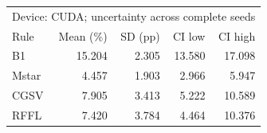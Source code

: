 \begin{tabular}{lrrrr}
\toprule
\multicolumn{5}{l}{Device: CUDA; uncertainty across complete seeds} \\
Rule & Mean (\%) & SD (pp) & CI low & CI high \\
\midrule
B1 & 15.204 & 2.305 & 13.580 & 17.098 \\
Mstar & 4.457 & 1.903 & 2.966 & 5.947 \\
CGSV & 7.905 & 3.413 & 5.222 & 10.589 \\
RFFL & 7.420 & 3.784 & 4.464 & 10.376 \\
\bottomrule
\end{tabular}

